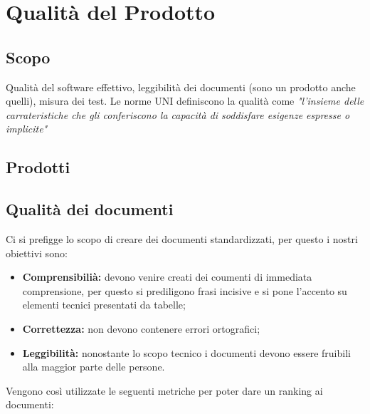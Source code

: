 \section{Qualità del Prodotto}
\subsection{Scopo}
Qualità del software effettivo, leggibilità dei documenti (sono un prodotto anche quelli), misura dei test.
Le norme UNI definiscono la qualità come \textit{"l'insieme delle carrateristiche che gli conferiscono la capacità di soddisfare esigenze espresse o implicite"}
\subsection{Prodotti}
\subsection{Qualità dei documenti}
Ci si prefigge lo scopo di creare dei documenti standardizzati, per questo i nostri obiettivi sono:
\begin{itemize}
	\item{\textbf{Comprensibilià:} devono venire creati dei coumenti di immediata comprensione, per questo si prediligono frasi incisive e si pone l'accento su elementi tecnici presentati da tabelle;}
	\item{\textbf{Correttezza:} non devono contenere errori ortografici;}
	\item{\textbf{Leggibilità:} nonostante lo scopo tecnico i documenti devono essere fruibili alla maggior parte delle persone.}
\end{itemize}
Vengono così utilizzate le seguenti metriche per poter dare un ranking ai documenti:
